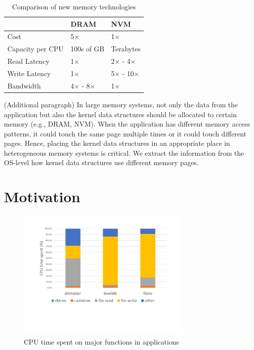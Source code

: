\documentclass{sig-alternate}
\begin{document}
\begin{table}[t]
\centering
\begin{tabular}{|l|l|l|}
\hline
                 & DRAM       & NVM        \\ \hline
Cost             & 5$\times$        & 1$\times$        \\ \hline
Capacity per CPU & 100s of GB & Terabytes  \\ \hline
Read Latency     & 1$\times$        & 2$\times$ - 4$\times$  \\ \hline
Write Latency    & 1$\times$        & 5$\times$ - 10$\times$ \\ \hline
Bandwidth        & 4$\times$ - 8$\times$  & 1$\times$        \\ \hline
\end{tabular}
\caption{Comparison of new memory technologies \cite{venkataraman2011consistent, dulloor2016data, kannan2017heteroos}}
\end{table}

(Additional paragraph) In large memory systems, not only the data from the application but also the kernel data structures should be allocated to certain memory (e.g., DRAM, NVM). When the application has different memory access patterns, it could touch the same page multiple times or it could touch different pages. Hence, placing the kernel data structures in an appropriate place in heterogeneous memory systems is critical. We extract the information from the OS-level how kernel data structures use different memory pages. 

\section{Motivation}


\begin{figure}
  \includegraphics[width=85mm]{cputime.pdf}
  \caption{CPU time spent on major functions in applications}
  \label{cputime}
\end{figure}
\end{document}
